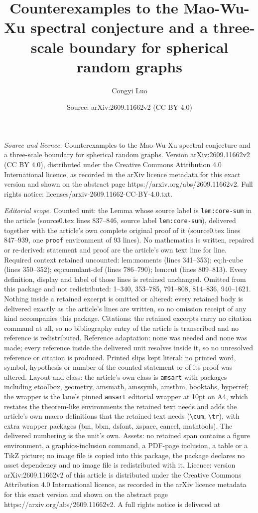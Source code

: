 \documentclass[10pt,a4paper]{amsart}
\title[Counterexamples to the Mao-Wu-Xu spectral conjecture and a t]{Counterexamples to the Mao-Wu-Xu spectral conjecture and a three-scale boundary for spherical random graphs}
\author{Congyi Luo}
\date{Source: arXiv:2609.11662v2 (CC BY 4.0)}
\begin{document}
\maketitle

\noindent\emph{Source and licence.} Counterexamples to the Mao-Wu-Xu spectral conjecture and a three-scale boundary for spherical random graphs. Version arXiv:2609.11662v2 (CC BY 4.0), distributed under the Creative Commons Attribution 4.0 International licence, as recorded in the arXiv licence metadata for this exact version and shown on the abstract page https://arxiv.org/abs/2609.11662v2. Full rights notice: licenses/arxiv-2609.11662-CC-BY-4.0.txt.\par\smallskip

\noindent\textit{Editorial scope.} Counted unit: the Lemma whose source label is \texttt{lem:core-sum} in the article (source0.tex lines 837--846, source label \texttt{lem:core-sum}), delivered together with the article's own complete original proof of it (source0.tex lines 847--939, one \texttt{proof} environment of 93 lines). No mathematics is written, repaired or re-derived: statement and proof are the article's own text line for line. Required context retained uncounted: lem:moments (lines 341--353); eq:h-cube (lines 350--352); eq:cumulant-def (lines 786--790); lem:cut (lines 809--813). Every definition, display and label of those lines is retained unchanged. Omitted from this package and not redistributed: 1--340, 353--785, 791--808, 814--836, 940--1621. Nothing inside a retained excerpt is omitted or altered: every retained body is delivered exactly as the article's lines are written, so no omission receipt of any kind accompanies this package. Citations: the retained excerpts carry no citation command at all, so no bibliography entry of the article is transcribed and no reference is redistributed. Reference adaptation: none was needed and none was made; every reference inside the delivered unit resolves inside it, so no unresolved reference or citation is produced. Printed slips kept literal: no printed word, symbol, hypothesis or number of the counted statement or of its proof was altered. Layout and class: the article's own class is \texttt{amsart} with packages including etoolbox, geometry, amsmath, amssymb, amsthm, booktabs, hyperref; the wrapper is the lane's pinned \texttt{amsart} editorial wrapper at 10pt on A4, which restates the theorem-like environments the retained text needs and adds the article's own macro definitions that the retained text needs (\texttt{\textbackslash cum}, \texttt{\textbackslash tr}), with extra wrapper packages (bm, bbm, dsfont, xspace, cancel, mathtools). The delivered numbering is the unit's own. Assets: no retained span contains a figure environment, a graphics-inclusion command, a PDF-page inclusion, a table or a TikZ picture; no image file is copied into this package, the package declares no asset dependency and no image file is redistributed with it. Licence: version arXiv:2609.11662v2 of this article is distributed under the Creative Commons Attribution 4.0 International licence, as recorded in the arXiv licence metadata for this exact version and shown on the abstract page https://arxiv.org/abs/2609.11662v2. A full rights notice is delivered at 
\end{document}
